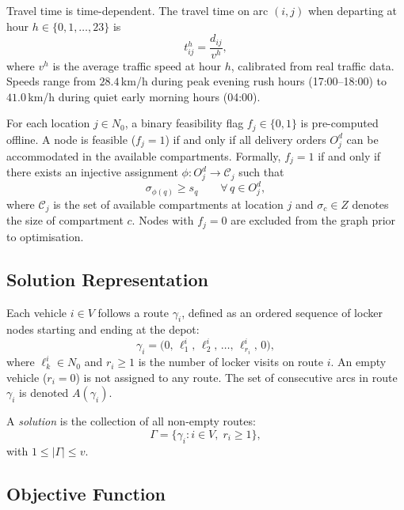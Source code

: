 Travel time is time-dependent. The travel time on arc $(i, j)$ when departing at
hour $h \in \{0, 1, \ldots, 23\}$ is
\begin{equation}
    t_{ij}^{h} = \frac{d_{ij}}{v^h},
    \label{eq:travel_time}
\end{equation}
where $v^h$ is the average traffic speed at hour $h$, calibrated from real
traffic data. Speeds range from $28.4$\,km/h during peak evening rush hours
(17:00--18:00) to $41.0$\,km/h during quiet early morning hours (04:00).

For each location $j \in N_0$, a binary feasibility flag $f_j \in \{0, 1\}$ is
pre-computed offline. A node is feasible ($f_j = 1$) if and only if all delivery
orders $O_j^d$ can be accommodated in the available compartments. Formally,
$f_j = 1$ if and only if there exists an injective assignment
$\phi: O_j^d \to \mathcal{C}_j$ such that
\begin{equation}
    \sigma_{\phi(q)} \geq s_q \qquad \forall\, q \in O_j^d,
    \label{eq:feasibility}
\end{equation}
where $\mathcal{C}_j$ is the set of available compartments at location $j$ and
$\sigma_c \in Z$ denotes the size of compartment $c$. Nodes with $f_j = 0$ are
excluded from the graph prior to optimisation.

\subsection{Solution Representation}

Each vehicle $i \in V$ follows a route $\gamma_i$, defined as an ordered
sequence of locker nodes starting and ending at the depot:
\begin{equation}
    \gamma_i = \bigl(0,\, \ell_1^i,\, \ell_2^i,\, \ldots,\, \ell_{r_i}^i,\, 0\bigr),
    \label{eq:route}
\end{equation}
where $\ell_k^i \in N_0$ and $r_i \geq 1$ is the number of locker visits on
route $i$. An empty vehicle ($r_i = 0$) is not assigned to any route. The set of
consecutive arcs in route $\gamma_i$ is denoted $A(\gamma_i)$.

A \emph{solution} is the collection of all non-empty routes:
\begin{equation}
    \Gamma = \bigl\{\gamma_i : i \in V,\; r_i \geq 1\bigr\},
    \label{eq:solution}
\end{equation}
with $1 \leq |\Gamma| \leq v$.

\subsection{Objective Function}

